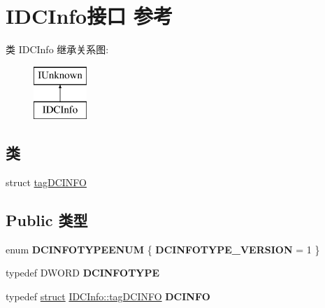 \hypertarget{interface_i_d_c_info}{}\section{I\+D\+C\+Info接口 参考}
\label{interface_i_d_c_info}
类 I\+D\+C\+Info 继承关系图\+:\begin{figure}[H]
\begin{center}
\leavevmode
\includegraphics[height=2.000000cm]{interface_i_d_c_info}
\end{center}
\end{figure}
\subsection*{类}
\begin{DoxyCompactItemize}
\item 
struct \hyperlink{struct_i_d_c_info_1_1tag_d_c_i_n_f_o}{tag\+D\+C\+I\+N\+FO}
\end{DoxyCompactItemize}
\subsection*{Public 类型}
\begin{DoxyCompactItemize}
\item 
\mbox{\label{interface_i_d_c_info_ae09f1adbee7449e548f0ff5a84488831}} 
enum {\bfseries D\+C\+I\+N\+F\+O\+T\+Y\+P\+E\+E\+N\+UM} \{ {\bfseries D\+C\+I\+N\+F\+O\+T\+Y\+P\+E\+\_\+\+V\+E\+R\+S\+I\+ON} = 1
 \}
\item 
\mbox{\label{interface_i_d_c_info_a1b5934149f32252bab1be77175e991f1}} 
typedef D\+W\+O\+RD {\bfseries D\+C\+I\+N\+F\+O\+T\+Y\+PE}
\item 
\mbox{\label{interface_i_d_c_info_ae9cdca874de0bdf4b6e37affabcf9733}} 
typedef \hyperlink{interfacestruct}{struct} \hyperlink{struct_i_d_c_info_1_1tag_d_c_i_n_f_o}{I\+D\+C\+Info\+::tag\+D\+C\+I\+N\+FO} {\bfseries D\+C\+I\+N\+FO}
\end{DoxyCompactItemize}
